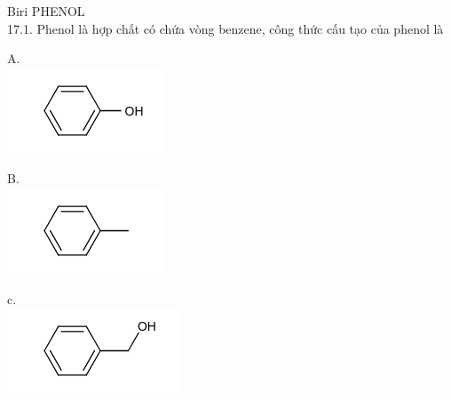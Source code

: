 \documentclass[10pt]{article}
\begin{document}
Biri PHENOL\\
17.1. Phenol là hợp chất có chứa vòng benzene, công thức cấu tạo của phenol là

A.\\
\includegraphics{smile-fa999fc561f61258549890000f1b500b37b4b19f}

B.\\
\includegraphics{smile-30009642d84c092f41f86e90a3c76c29e6bff052}

c.\\
\includegraphics{smile-833163e32582dbe22b90e277f3eafc698148ef5c}
\end{document}
